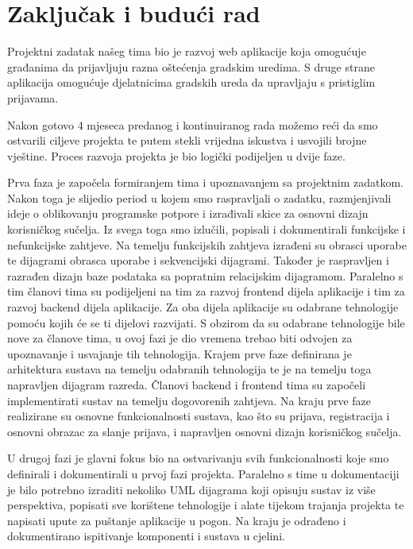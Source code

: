 \chapter{Zaključak i budući rad}
		
		Projektni zadatak našeg tima bio je razvoj web aplikacije koja omogućuje građanima da prijavljuju razna oštećenja gradskim uredima. S druge strane aplikacija omogućuje djelatnicima gradskih ureda da upravljaju s pristiglim prijavama.
		
		Nakon gotovo 4 mjeseca predanog i kontinuiranog rada možemo reći da smo ostvarili ciljeve projekta te putem stekli vrijedna iskustva i usvojili brojne vještine. Proces razvoja projekta je bio logički podijeljen u dvije faze.
		
		Prva faza je započela formiranjem tima i upoznavanjem sa projektnim zadatkom. Nakon toga je slijedio period u kojem smo raspravljali o zadatku, razmjenjivali ideje o oblikovanju programske potpore i izrađivali skice za osnovni dizajn korisničkog sučelja. Iz svega toga smo izlučili, popisali i dokumentirali funkcijske i nefunkcijske zahtjeve. Na temelju funkcijskih zahtjeva izrađeni su obrasci uporabe te dijagrami obrasca uporabe i sekvencijski dijagrami. Također je raspravljen i razrađen dizajn baze podataka sa popratnim relacijskim dijagramom. Paralelno s tim članovi tima su podijeljeni na tim za razvoj frontend dijela aplikacije i tim za razvoj backend dijela aplikacije. Za oba dijela aplikacije su odabrane tehnologije pomoću kojih će se ti dijelovi razvijati. S obzirom da su odabrane tehnologije bile nove za članove tima, u ovoj fazi je dio vremena trebao biti odvojen za upoznavanje i usvajanje tih tehnologija. Krajem prve faze definirana je arhitektura sustava na temelju odabranih tehnologija te je na temelju toga napravljen dijagram razreda. Članovi backend i frontend tima su započeli implementirati sustav na temelju dogovorenih zahtjeva. Na kraju prve faze realizirane su osnovne funkcionalnosti sustava, kao što su prijava, registracija i osnovni obrazac za slanje prijava, i napravljen osnovni dizajn korisničkog sučelja.
		
		U drugoj fazi je glavni fokus bio na ostvarivanju svih funkcionalnosti koje smo definirali i dokumentirali u prvoj fazi projekta. Paralelno s time u dokumentaciji je bilo potrebno izraditi nekoliko UML dijagrama koji opisuju sustav iz više perspektiva, popisati sve korištene tehnologije i alate tijekom trajanja projekta te napisati upute za puštanje aplikacije u pogon. Na kraju je odrađeno i dokumentirano ispitivanje komponenti i sustava u cjelini.
		
